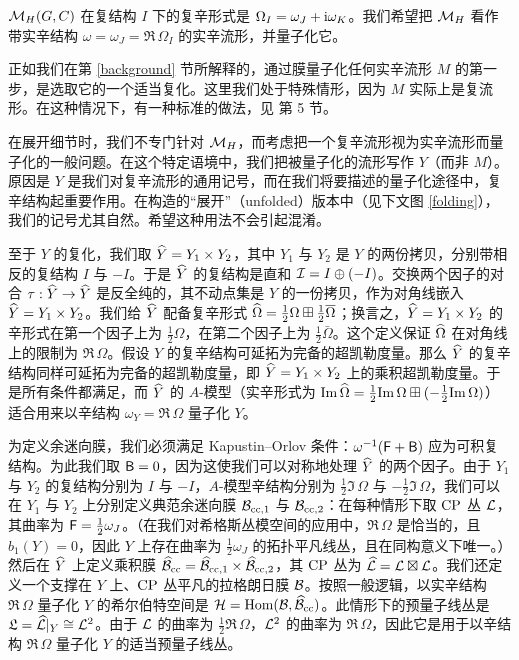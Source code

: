 ${\mathcal M}_H(G,C)$ 在复结构 $I$ 下的复辛形式是 $\Omega_I=\omega_J+{\mathrm i}\omega_K$。我们希望把 ${\mathcal M}_H$ 看作带实辛结构 $\omega=\omega_J=\Re\,\Omega_I$ 的实辛流形，并量子化它。

正如我们在第 \ref{background} 节所解释的，通过膜量子化任何实辛流形 $M$ 的第一步，是选取它的一个适当复化。这里我们处于特殊情形，因为 $M$ 实际上是复流形。在这种情况下，有一种标准的做法，见 \cite{GW} 第 5 节。

在展开细节时，我们不专门针对 ${\mathcal M}_H$，而考虑把一个复辛流形视为实辛流形而量子化的一般问题。在这个特定语境中，我们把被量子化的流形写作 $Y$（而非 $M$）。原因是 $Y$ 是我们对复辛流形的通用记号，而在我们将要描述的量子化途径中，复辛结构起重要作用。在构造的“展开”（unfolded）版本中（见下文图 \ref{folding}），我们的记号尤其自然。希望这种用法不会引起混淆。

至于 $Y$ 的复化，我们取 $\widehat Y=Y_1\times Y_2$，其中 $Y_1$ 与 $Y_2$ 是 $Y$ 的两份拷贝，分别带相反的复结构 $I$ 与 $-I$。于是 $\widehat Y$ 的复结构是直和 ${\mathcal I}=I\oplus (-I)$。交换两个因子的对合 $\tau:\widehat Y\to\widehat Y$ 是反全纯的，其不动点集是 $Y$ 的一份拷贝，作为对角线嵌入 $\widehat Y=Y_1\times Y_2$。我们给 $\widehat Y$ 配备复辛形式 $\widehat\Omega=\frac{1}{2}\Omega\boxplus \frac{1}{2}\overline\Omega$；换言之，$\widehat Y=Y_1\times Y_2$ 的辛形式在第一个因子上为 $\frac{1}{2}\Omega$，在第二个因子上为 $\frac{1}{2}\bar\Omega$。这个定义保证 $\widehat\Omega$ 在对角线上的限制为 $\Re\,\Omega$。假设 $Y$ 的复辛结构可延拓为完备的超凯勒度量。那么 $\widehat Y$ 的复辛结构同样可延拓为完备的超凯勒度量，即 $\widehat Y=Y_1\times Y_2$ 上的乘积超凯勒度量。于是所有条件都满足，而 $\widehat Y$ 的 $A$-模型（实辛形式为 ${\mathrm{Im}}\,\widehat\Omega=\frac{1}{2}{\mathrm{Im}}\,\Omega\boxplus (-\frac{1}{2}{\mathrm{Im}}\,\Omega)$）适合用来以辛结构 $\omega_Y=\Re\,\Omega$ 量子化 $Y$。

为定义余迷向膜，我们必须满足 Kapustin–Orlov 条件：$\omega^{-1} ({\sf F}+{\sf B})$ 应为可积复结构。为此我们取 ${\sf B}=0$，因为这使我们可以对称地处理 $\widehat Y$ 的两个因子。由于 $Y_1$ 与 $Y_2$ 的复结构分别为 $I$ 与 $-I$，$A$-模型辛结构分别为 $\frac{1}{2}\Im\,\Omega$ 与 $-\frac{1}{2}\Im\,\Omega$，我们可以在 $Y_1$ 与 $Y_2$ 上分别定义典范余迷向膜 ${\mathcal B}_{{\mathrm{cc}},1}$ 与 ${\mathcal B}_{{\mathrm{cc}},2}$：在每种情形下取 ${\mathrm{CP}}$ 丛 ${\mathcal L}$，其曲率为 ${\sf F}=\frac{1}{2}\omega_J$。（在我们对希格斯丛模空间的应用中，$\Re\,\Omega$ 是恰当的，且 $b_1(Y)=0$，因此 $Y$ 上存在曲率为 $\frac{1}{2}\omega_J$ 的拓扑平凡线丛，且在同构意义下唯一。）然后在 $\widehat Y$ 上定义乘积膜 $\widehat{{\mathcal B}}_{\mathrm{cc}}=\widehat{{\mathcal B}}_{{\mathrm{cc}},1}\times \widehat{{\mathcal B}}_{{\mathrm{cc}},2}$，其 ${\mathrm{CP}}$ 丛为 $\widehat{{\mathcal L}}={\mathcal L}\boxtimes{\mathcal L}$。我们还定义一个支撑在 $Y$ 上、${\mathrm{CP}}$ 丛平凡的拉格朗日膜 ${\mathcal B}$。按照一般逻辑，以实辛结构 $\Re\,\Omega$ 量子化 $Y$ 的希尔伯特空间是 ${\mathcal H}={\mathrm{Hom}}({\mathcal B},\widehat{{\mathcal B}}_{\mathrm{cc}})$。此情形下的预量子线丛是 ${{\mathfrak L}}=\widehat{{\mathcal L}}|_Y\cong {\mathcal L}^2$。由于 ${\mathcal L}$ 的曲率为 $\frac{1}{2}\Re\,\Omega$，${\mathcal L}^2$ 的曲率为 $\Re\,\Omega$，因此它是用于以辛结构 $\Re\,\Omega$ 量子化 $Y$ 的适当预量子线丛。

